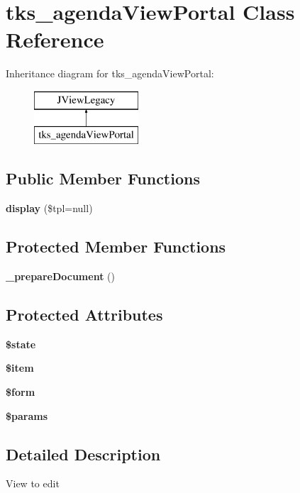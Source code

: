 \section{tks\+\_\+agenda\+View\+Portal Class Reference}
\label{classtks__agenda_view_portal}
Inheritance diagram for tks\+\_\+agenda\+View\+Portal\+:\begin{figure}[H]
\begin{center}
\leavevmode
\includegraphics[height=2.000000cm]{classtks__agenda_view_portal}
\end{center}
\end{figure}
\subsection*{Public Member Functions}
\begin{DoxyCompactItemize}
\item 
\textbf{ display} (\$tpl=null)
\end{DoxyCompactItemize}
\subsection*{Protected Member Functions}
\begin{DoxyCompactItemize}
\item 
\textbf{ \+\_\+prepare\+Document} ()
\end{DoxyCompactItemize}
\subsection*{Protected Attributes}
\begin{DoxyCompactItemize}
\item 
\textbf{ \$state}
\item 
\textbf{ \$item}
\item 
\textbf{ \$form}
\item 
\textbf{ \$params}
\end{DoxyCompactItemize}


\subsection{Detailed Description}
View to edit

